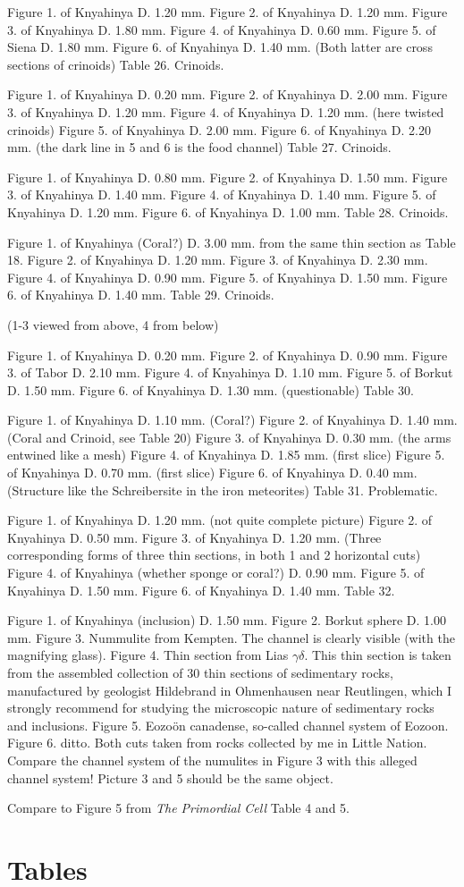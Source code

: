 \documentclass[a4paper, 11pt, oneside]{article}
\begin{document}
Figure 1. of Knyahinya D. 1.20 mm.
Figure 2. of Knyahinya D. 1.20 mm.
Figure 3. of Knyahinya D. 1.80 mm.
Figure 4. of Knyahinya D. 0.60 mm.
Figure 5. of Siena D. 1.80 mm.
Figure 6. of Knyahinya D. 1.40 mm. (Both latter are cross sections of crinoids)
Table 26. Crinoids.

Figure 1. of Knyahinya D. 0.20 mm.
Figure 2. of Knyahinya D. 2.00 mm.
Figure 3. of Knyahinya D. 1.20 mm.
Figure 4. of Knyahinya D. 1.20 mm. (here twisted crinoids)
Figure 5. of Knyahinya D. 2.00 mm.
Figure 6. of Knyahinya D. 2.20 mm. (the dark line in 5 and 6 is the food channel)
Table 27. Crinoids.

Figure 1. of Knyahinya D. 0.80 mm.
Figure 2. of Knyahinya D. 1.50 mm.
Figure 3. of Knyahinya D. 1.40 mm.
Figure 4. of Knyahinya D. 1.40 mm.
Figure 5. of Knyahinya D. 1.20 mm.
Figure 6. of Knyahinya D. 1.00 mm.
Table 28. Crinoids.

Figure 1. of Knyahinya (Coral?) D. 3.00 mm. from the same thin section as Table 18.
Figure 2. of Knyahinya D. 1.20 mm.
Figure 3. of Knyahinya D. 2.30 mm.
Figure 4. of Knyahinya D. 0.90 mm.
Figure 5. of Knyahinya D. 1.50 mm.
Figure 6. of Knyahinya D. 1.40 mm.
Table 29. Crinoids.

(1-3 viewed from above, 4 from below)

Figure 1. of Knyahinya D. 0.20 mm.
Figure 2. of Knyahinya D. 0.90 mm.
Figure 3. of Tabor D. 2.10 mm.
Figure 4. of Knyahinya D. 1.10 mm.
Figure 5. of Borkut D. 1.50 mm.
Figure 6. of Knyahinya D. 1.30 mm. (questionable)
Table 30.

Figure 1. of Knyahinya D. 1.10 mm. (Coral?)
Figure 2. of Knyahinya D. 1.40 mm. (Coral and Crinoid, see Table 20)
Figure 3. of Knyahinya D. 0.30 mm. (the arms entwined like a mesh)
Figure 4. of Knyahinya D. 1.85 mm. (first slice)
Figure 5. of Knyahinya D. 0.70 mm. (first slice)
Figure 6. of Knyahinya D. 0.40 mm. (Structure like the Schreibersite in the iron meteorites)
Table 31. Problematic.

Figure 1. of Knyahinya D. 1.20 mm. (not quite complete picture)
Figure 2. of Knyahinya D. 0.50 mm.
Figure 3. of Knyahinya D. 1.20 mm. (Three corresponding forms of three thin sections, in both 1 and 2 horizontal cuts)
Figure 4. of Knyahinya (whether sponge or coral?) D. 0.90 mm.
Figure 5. of Knyahinya D. 1.50 mm.
Figure 6. of Knyahinya D. 1.40 mm.
Table 32.

Figure 1. of Knyahinya (inclusion) D. 1.50 mm.
Figure 2. Borkut sphere D. 1.00 mm.
Figure 3. Nummulite from Kempten. The channel is clearly visible (with the magnifying glass).
Figure 4. Thin section from Lias $\gamma\delta$. This thin section is taken from the assembled collection of 30 thin sections of sedimentary rocks, manufactured by geologist Hildebrand in Ohmenhausen near Reutlingen, which I strongly recommend for studying the microscopic nature of sedimentary rocks and inclusions.
Figure 5. Eozoön canadense, so-called channel system of Eozoon.
Figure 6. ditto. Both cuts taken from rocks collected by me in Little Nation. Compare the channel system of the numulites in Figure 3 with this alleged channel system! Picture 3 and 5 should be the same object.

Compare to Figure 5 from \emph{The Primordial Cell} Table 4 and 5.
\clearpage
\section{Tables}
\end{document}
